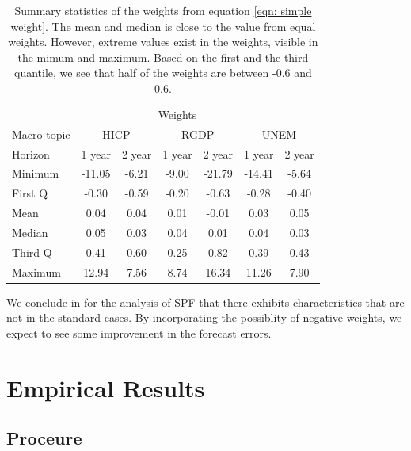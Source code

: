 \documentclass[]{article}
\begin{document}
\begin{table}[!h]
\centering
\caption{Summary statistics of the weights from equation \ref{eqn: simple weight}. The mean and median is close to the value from equal weights. However, extreme values exist in the weights, visible in the mimum and maximum. Based on the first and the third quantile, we see that half of the weights are between -0.6 and 0.6.}
\label{tab: simple weight summary statistics}
\begin{tabular}{lcccccc}%
\hline
&\multicolumn{5}{c}{Weights}\\
\cmidrule{2-7}
Macro topic & \multicolumn{2}{c}{HICP} & \multicolumn{2}{c}{RGDP} & \multicolumn{2}{c}{UNEM} \\
\cmidrule{2-3} \cmidrule{4-5}\cmidrule{6-7}
Horizon     & 1 year & 2 year & 1 year & 2 year & 1 year & 2 year \\ 
\cmidrule{2-2} \cmidrule{3-3} \cmidrule{4-4} \cmidrule{5-5} \cmidrule{6-6} \cmidrule{7-7}
Minimum      & -11.05      & -6.21      & -9.00      & -21.79      & -14.41      & -5.64      \\
First Q      & -0.30       & -0.59      & -0.20      & -0.63       & -0.28       & -0.40      \\
Mean         & 0.04        & 0.04       & 0.01       & -0.01       & 0.03        & 0.05       \\
Median       & 0.05        & 0.03       & 0.04       & 0.01        & 0.04        & 0.03       \\
Third Q      & 0.41        & 0.60       & 0.25       & 0.82        & 0.39        & 0.43       \\
Maximum      & 12.94       & 7.56       & 8.74       & 16.34       & 11.26       & 7.90       \\ 
\hline
\end{tabular}
\end{table}

We conclude in for the analysis of SPF that there exhibits
characteristics that are not in the standard cases. By incorporating the
possiblity of negative weights, we expect to see some improvement in the
forecast errors.

\section{Empirical Results}\label{empirical-results}

\subsection{Proceure}\label{proceure}
\end{document}
